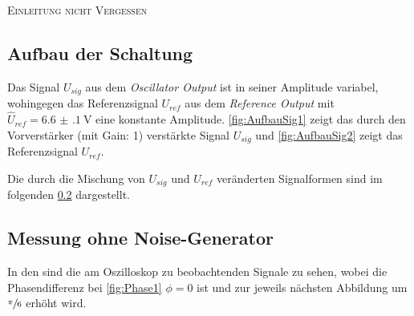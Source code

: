 \textsc{\color{green}Einleitung nicht Vergessen}  

\subsection{Aufbau der Schaltung}
	Das Signal $U_{sig}$ aus dem \emph{Oscillator Output} ist in seiner Amplitude variabel, wohingegen das Referenzsignal $U_{ref}$ 
	aus dem \emph{Reference Output} mit $\hat{U}_{ref} = \SI{6.6(1)}{\volt} $ eine konstante Amplitude.   
	\cref{fig:AufbauSig1} zeigt das durch den Vorverstärker (mit Gain: 1) verstärkte Signal $U_{sig}$  und \cref{fig:AufbauSig2} 
	zeigt das Referenzsignal $U_{ref}$.
	
%	

	Die durch die Mischung von $U_{sig}$ und $U_{ref}$ veränderten Signalformen sind im folgenden \cref{sec:ohneNoise} dargestellt.
\subsection{Messung ohne Noise-Generator}\label{sec:ohneNoise}
	In den  sind die am Oszilloskop zu beobachtenden Signale zu sehen, wobei die Phasendifferenz
	bei \cref{fig:Phase1} $\phi = 0$ ist und zur jeweils nächsten Abbildung um $\sfrac{\pi}{6}$ erhöht wird.
	
%		
%		
%
%

